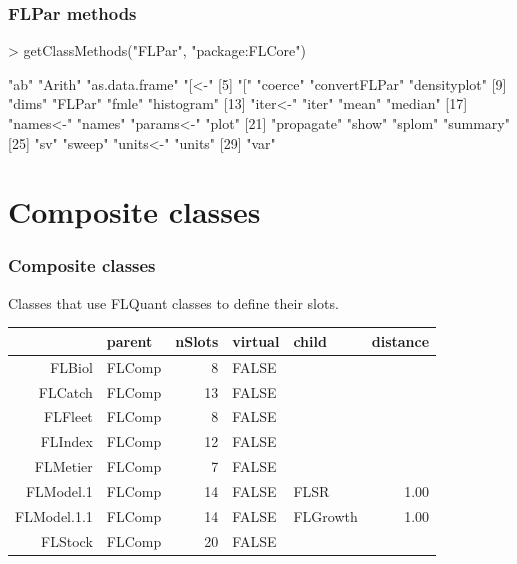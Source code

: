 \documentclass{beamer}%
\begin{document}
\begin{frame}[containsverbatim]
  \frametitle{FLPar methods}

{\tiny{
\begin{Schunk}
\begin{Sinput}
> getClassMethods("FLPar", "package:FLCore")
\end{Sinput}
\begin{Soutput}
 [1] "ab"            "Arith"         "as.data.frame" "[<-"          
 [5] "["             "coerce"        "convertFLPar"  "densityplot"  
 [9] "dims"          "FLPar"         "fmle"          "histogram"    
[13] "iter<-"        "iter"          "mean"          "median"       
[17] "names<-"       "names"         "params<-"      "plot"         
[21] "propagate"     "show"          "splom"         "summary"      
[25] "sv"            "sweep"         "units<-"       "units"        
[29] "var"          
\end{Soutput}
\end{Schunk}
}}

\end{frame}

\section{Composite classes}
\begin{frame}[containsverbatim]
  \frametitle{Composite classes}

Classes that use FLQuant classes to define their slots.

\scriptsize{
\begin{table}[ht]
\begin{center}
\begin{tabular}{rlrllr}
  \hline
 & parent & nSlots & virtual & child & distance \\ 
  \hline
FLBiol & FLComp &   8 & FALSE &  &  \\ 
  FLCatch & FLComp &  13 & FALSE &  &  \\ 
  FLFleet & FLComp &   8 & FALSE &  &  \\ 
  FLIndex & FLComp &  12 & FALSE &  &  \\ 
  FLMetier & FLComp &   7 & FALSE &  &  \\ 
  FLModel.1 & FLComp &  14 & FALSE & FLSR & 1.00 \\ 
  FLModel.1.1 & FLComp &  14 & FALSE & FLGrowth & 1.00 \\ 
  FLStock & FLComp &  20 & FALSE &  &  \\ 
   \hline
\end{tabular}
\end{center}
\end{table}}

\end{frame}
\end{document}
